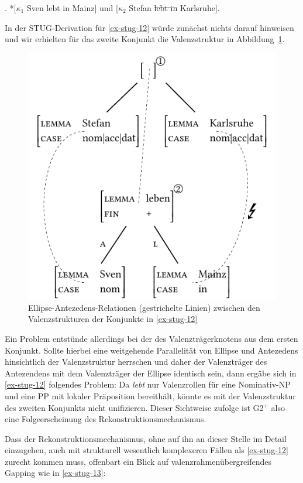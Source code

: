 \ex. \label{ex-stug-12} *[$\kappa_1$ Sven lebt in Mainz] und [$\kappa_2$ Stefan \sout{lebt in} Karlsruhe]. 

In der STUG-Derivation für \ref{ex-stug-12} würde zunächst nichts darauf hinweisen und wir erhielten für das zweite Konjunkt die Valenzstruktur in Abbildung~\ref{fig-stug-16}. 
\begin{figure}[t]
\centering
\includegraphics{graphics/abb916.pdf}
\caption{\label{fig-stug-16}Ellipse-Antezedens-Relationen (gestrichelte Linien) zwischen den Valenzstrukturen der Konjunkte in \ref{ex-stug-12}}
\end{figure}
Ein Problem entstünde allerdings bei der  des Valenzträgerknotens aus dem ersten Konjunkt. Sollte hierbei eine weitgehende Parallelität von Ellipse und Antezedens hinsichtlich der Valenzstruktur herrschen und daher der Valenzträger des Antezendens mit dem Valenzträger der Ellipse identisch sein, dann ergäbe sich in \ref{ex-stug-12} folgendes Problem: Da {\it lebt} nur Valenzrollen für eine Nominativ-NP und eine PP mit lokaler Präposition bereithält, könnte es mit der Valenzstruktur des zweiten Konjunkts nicht unifizieren. Dieser Sichtweise zufolge ist G2$^+$ also eine Folgeerscheinung des Rekonstruktionsmechanismus.  

Dass der Rekonstruktionsmechanismus, ohne auf ihn an dieser Stelle im Detail einzugehen, auch mit strukturell wesentlich komplexeren Fällen als \ref{ex-stug-12} zurecht kommen muss, offenbart ein Blick auf valenzrahmenübergreifendes Gapping wie in \ref{ex-stug-13}:

